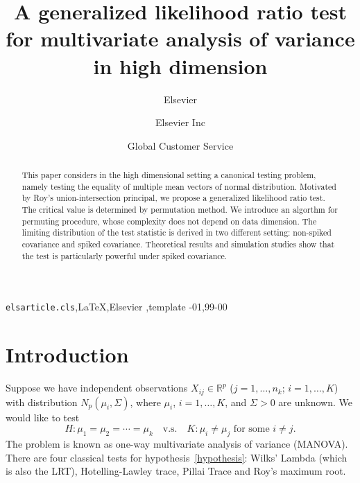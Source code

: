 \documentclass[review]{elsarticle}
\theoremstyle{plain}
\theoremstyle{definition}
\theoremstyle{remark}
\begin{document}
\begin{frontmatter}

\title{A generalized likelihood ratio test for multivariate analysis of variance in high dimension}

\author{Elsevier}
\address{Radarweg 29, Amsterdam}

\author[mymainaddress,mysecondaryaddress]{Elsevier Inc}

\author[mysecondaryaddress]{Global Customer Service}

\address[mymainaddress]{1600 John F Kennedy Boulevard, Philadelphia}
\address[mysecondaryaddress]{360 Park Avenue South, New York}

\begin{abstract}
    This paper considers in the high dimensional setting a canonical testing problem, namely testing the equality of multiple mean vectors of normal distribution.
    Motivated by Roy's union-intersection principal, we propose a generalized likelihood ratio test.
    The critical value is determined by permutation method.
    We introduce an algorthm for permuting procedure, whose complexity does not depend on data dimension.
    The limiting distribution of the test statistic is derived in two different setting: non-spiked covariance and spiked covariance.
    Theoretical results and simulation studies show that the test is particularly powerful under spiked covariance.
\end{abstract}

\begin{keyword}
\texttt{elsarticle.cls}\sep \LaTeX\sep Elsevier \sep template
-01\sep  99-00
\end{keyword}

\end{frontmatter}

\linenumbers
\section{Introduction}
Suppose we have independent observations $X_{ij}\in \mathbb{R}^p$ ($j=1,\ldots,n_k$; $i=1,\ldots, K$) with distribution $N_p(\mu_i,\Sigma)$, where $\mu_i$, $i=1,\ldots,K$, and $\Sigma>0$ are unknown. We would like to test
\begin{equation}\label{hypothesis}
    H: \mu_1=\mu_2=\cdots=\mu_k\quad \text{v.s.}\quad K: \text{$\mu_i\neq \mu_j$ for some $i\neq j$}.
\end{equation}
The problem is known as one-way multivariate analysis of variance (MANOVA).
There are four classical tests for hypothesis~\eqref{hypothesis}: Wilks' Lambda (which is also the LRT), Hotelling-Lawley trace, Pillai Trace and Roy's maximum root.
\end{document}

